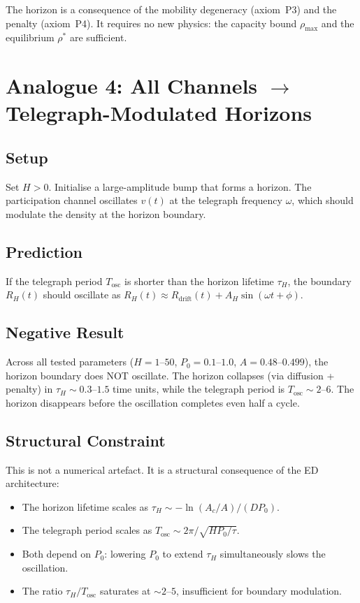 \documentclass[11pt]{article}
\begin{document}
The horizon is a consequence of the mobility degeneracy (axiom~P3) and the penalty (axiom~P4). It requires no new physics: the capacity bound \(\rho_{\max}\) and the equilibrium \(\rho^*\) are sufficient.

\section{Analogue 4: All Channels \texorpdfstring{$\to$}{->} Telegraph-Modulated Horizons}

\subsection{Setup}

Set \(H > 0\). Initialise a large-amplitude bump that forms a horizon. The participation channel oscillates \(v(t)\) at the telegraph frequency \(\omega\), which should modulate the density at the horizon boundary.

\subsection{Prediction}

If the telegraph period \(T_{\mathrm{osc}}\) is shorter than the horizon lifetime \(\tau_H\), the boundary \(R_H(t)\) should oscillate as \(R_H(t) \approx R_{\mathrm{drift}}(t) + A_H\sin(\omega t + \phi)\).

\subsection{Negative Result}

Across all tested parameters (\(H = 1\)--\(50\), \(P_0 = 0.1\)--\(1.0\), \(A = 0.48\)--\(0.499\)), the horizon boundary does NOT oscillate. The horizon collapses (via diffusion + penalty) in \(\tau_H \sim 0.3\)--\(1.5\) time units, while the telegraph period is \(T_{\mathrm{osc}} \sim 2\)--\(6\). The horizon disappears before the oscillation completes even half a cycle.

\subsection{Structural Constraint}

This is not a numerical artefact. It is a structural consequence of the ED architecture:
\begin{itemize}
  \item The horizon lifetime scales as \(\tau_H \sim -\ln(A_c/A)/(DP_0)\).
  \item The telegraph period scales as \(T_{\mathrm{osc}} \sim 2\pi/\sqrt{HP_0/\tau}\).
  \item Both depend on \(P_0\): lowering \(P_0\) to extend \(\tau_H\) simultaneously slows the oscillation.
  \item The ratio \(\tau_H/T_{\mathrm{osc}}\) saturates at \(\sim 2\)--\(5\), insufficient for boundary modulation.
\end{itemize}
\end{document}
